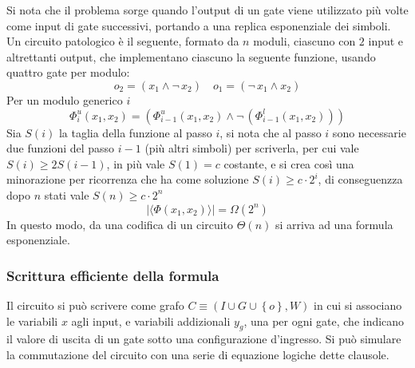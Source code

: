 

Si nota che il problema sorge quando l'output di un gate viene utilizzato più volte come input di gate successivi, portando a una replica esponenziale dei simboli.
Un circuito patologico è il seguente, formato da $n$ moduli, ciascuno con $2$ input e altrettanti output, che implementano ciascuno la seguente funzione, usando quattro gate per modulo:
$$
o_2 = \left( x_1 \wedge \neg \, x_2 \right)
\quad
o_1 = \left( \neg \, x_1 \wedge x_2 \right)
$$
Per un modulo generico $i$
$$
\Phi_{i}^{u} \left( x_1, x_2 \right)
= \left( 
\Phi_{i-1}^{u} \left( x_1, x_2 \right)
\wedge \neg \, 
\left( 
\Phi_{i-1}^{l} \left( x_1, x_2 \right)
\right)
\right)
$$
Sia $S(i)$ la taglia della funzione al passo $i$, si nota che al passo $i$ sono necessarie due funzioni del passo $i-1$ (più altri simboli) per scriverla, per cui vale $S(i) \ge 2 S (i-1)$, in più vale $S(1)=c$ costante, e si crea così una minorazione per ricorrenza che ha come soluzione $S(i) \ge c \cdot 2^i$, di conseguenzza dopo $n$ stati vale $S(n) \ge c \cdot 2^n$
\begin{equation*}
    |\langle  \Phi \left( x_1, x_2 \right)  \rangle|
    = \Omega \left( 2^{n} \right)
\end{equation*}
In questo modo, da una codifica di un circuito $\Theta (n)$ si arriva ad una formula esponenziale.

\subsubsection{Scrittura efficiente della formula}

Il circuito si può scrivere come grafo
$C \equiv \left( I \cup G \cup \left\{ o \right\}, W \right)$
in cui si associano le variabili $x$ agli input, e variabili addizionali $y_g$, una per ogni gate, che indicano il valore di uscita di un gate sotto una configurazione d'ingresso. Si può simulare la commutazione del circuito con una serie di equazione logiche dette clausole.

